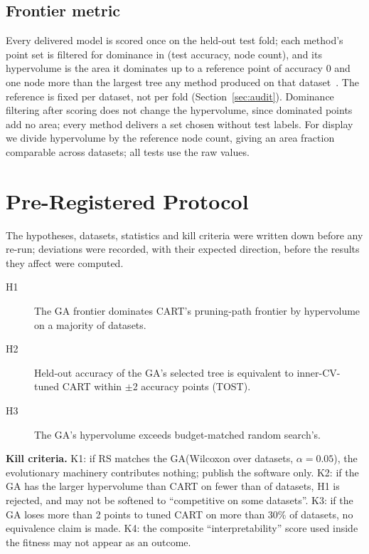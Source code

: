 \documentclass[sigconf,review,anonymous]{acmart}
\newcommand{\GA}{GA\xspace}
\newcommand{\RS}{RS\xspace}
\begin{document}
\subsection{Frontier metric}
Every delivered model is scored once on the held-out test fold; each method's point set
is filtered for dominance in (test accuracy, node count), and its hypervolume is the
area it dominates up to a reference point of accuracy 0 and one node more than the
largest tree any method produced on that dataset~\cite{zitzler1999}. The reference is
fixed per dataset, not per fold (Section~\ref{sec:audit}). Dominance filtering after
scoring does not change the hypervolume, since dominated points add no area; every method
delivers a set chosen without test labels. For display we divide hypervolume by the reference node count, giving an area
fraction comparable across datasets; all tests use the raw values.

\section{Pre-Registered Protocol}

The hypotheses, datasets, statistics and kill criteria were written down before any
re-run; deviations were recorded, with their expected direction, before the results
they affect were computed.

\begin{description}
\item[H1] The \GA frontier dominates CART's pruning-path frontier by hypervolume on a
majority of datasets.
\item[H2] Held-out accuracy of the \GA's selected tree is equivalent to inner-CV-tuned
CART within $\pm$2 accuracy points (TOST).
\item[H3] The \GA's hypervolume exceeds budget-matched random search's.
\end{description}

\textbf{Kill criteria.} K1: if \RS{} matches the \GA (Wilcoxon over datasets,
$\alpha=0.05$), the evolutionary machinery contributes nothing; publish the software
only. K2: if the \GA has the larger hypervolume than CART on fewer than
\KtwoThreshold{} of datasets, H1 is rejected, and may not be softened to ``competitive on
some datasets''. K3: if the \GA loses more than 2 points to tuned CART on more than
30\% of datasets, no equivalence claim is made. K4: the composite ``interpretability''
score used inside the fitness may not appear as an outcome.
\end{document}

